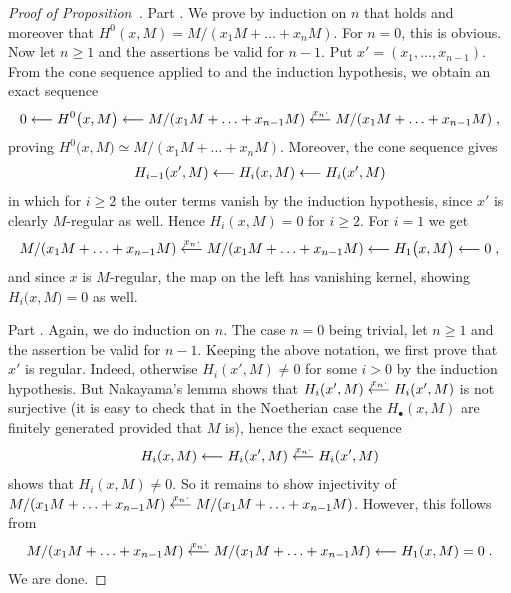 \documentclass[a4paper,parskip=half,numbers=enddot, DIV=12]{scrreprt}
\begin{document}
\begin{proof}[Proof of Proposition~]
	Part . We prove by induction on $n$ that  holds and moreover that $H^0(x,M)=M/(x_1M+\ldots+x_nM)$. For $n=0$, this is obvious. Now let $n\geq 1$ and the assertions be valid for $n-1$. Put $x'=(x_1,\ldots,x_{n-1})$. From the cone sequence  applied to  and the induction hypothesis, we obtain an exact sequence
	\begin{align*}
		0\lmorphism H^0\big(x,M\big)\lmorphism M/(x_1M+\ldots+x_{n-1}M)\lmorphism[x_n\cdot]M/(x_1M+\ldots+x_{n-1}M)\;,
	\end{align*}
	proving $H^0\big(x,M\big)\simeq M/(x_1M+\ldots+x_nM)$. Moreover, the cone sequence gives 
	\begin{align*}
		H_{i-1}(x',M)\lmorphism H_i(x,M)\lmorphism H_i(x',M)
	\end{align*}
	in which for $i\geq 2$ the outer terms vanish by the induction hypothesis, since $x'$ is clearly $M$-regular as well. Hence $H_i(x,M)=0$ for $i\geq 2$. For $i=1$ we get
	\begin{align*}
		M/(x_1M+\ldots+x_{n-1}M)\lmorphism[x_n\cdot]M/(x_1M+\ldots+x_{n-1}M)\lmorphism H_1\big(x,M\big)\lmorphism 0\;,
	\end{align*}
	and since $x$ is $M$-regular, the map on the left has vanishing kernel, showing $H_i\big(x,M\big)=0$ as well.
	
	Part . Again, we do induction on $n$. The case $n=0$ being trivial, let $n\geq 1$ and the assertion be valid for $n-1$. Keeping the above notation, we first prove that $x'$ is regular. Indeed, otherwise $H_i(x',M)\neq 0$ for some $i>0$ by the induction hypothesis. But Nakayama's lemma shows that $H_i(x',M)\lmorphism[x_n\cdot]H_i(x',M)$ is not surjective (it is easy to check that in the Noetherian case the $H_\bullet(x,M)$ are finitely generated provided that $M$ is), hence the exact sequence
	\begin{align*}
		H_i(x,M)\lmorphism H_i(x',M)\lmorphism[x_n\cdot]H_i(x',M)
	\end{align*}
	shows that $H_i(x,M)\neq 0$. So it remains to show injectivity of $M/(x_1M+\ldots+x_{n-1}M)\lmorphism[x_n\cdot]M/(x_1M+\ldots+x_{n-1}M)$. However, this follows from
	\begin{align*}
		M/(x_1M+\ldots+x_{n-1}M)\lmorphism[x_n\cdot]M/(x_1M+\ldots+x_{n-1}M)\lmorphism H_1(x,M)=0\;.
	\end{align*}
	We are done.
\end{proof}
\end{document}
